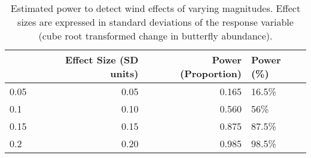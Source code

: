 \begin{table}[htbp]
\centering
\caption[Statistical power to detect wind effects]{Estimated power to detect wind effects of varying magnitudes. Effect sizes are expressed in standard deviations of the response variable (cube root transformed change in butterfly abundance).}
\label{tab:power_analysis}
\begin{tabular}[t]{lrrl}
\toprule
  & Effect Size (SD units) & Power (Proportion) & Power (\%)\\
\midrule
0.05 & 0.05 & 0.165 & 16.5\%\\
0.1 & 0.10 & 0.560 & 56\%\\
0.15 & 0.15 & 0.875 & 87.5\%\\
0.2 & 0.20 & 0.985 & 98.5\%\\
\bottomrule
\end{tabular}
\end{table}
